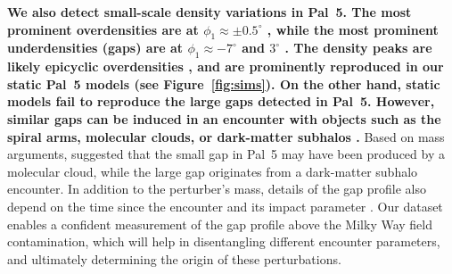 \documentclass[twocolumn]{aastex62}
\newcommand{\changes}[1]{{\textbf{#1}}}
\begin{document}
\changes{We also detect small-scale density variations in Pal~5.
The most prominent overdensities are at $\phi_1\approx\pm0.5^\circ$ \citep[consistent with][]{Kupper:2015}, while the most prominent underdensities (gaps) are at $\phi_1\approx-7^\circ$ and $3^\circ$ \citep[consistent with][]{Erkal:2017}.
The density peaks are likely epicyclic overdensities \citep[predicted by][]{Kupper:2008, Just:2009, Kupper:2010}, and are prominently reproduced in our static Pal~5 models (see Figure~\ref{fig:sims}).
On the other hand, static models fail to reproduce the large gaps detected in Pal~5.
However, similar gaps can be induced in an encounter with objects such as the spiral arms, molecular clouds, or dark-matter subhalos \citep[e.g.,][]{Johnston:2002,Ibata:2002,Yoon:2011,Amorisco:2016,Banik:2019}.
}
Based on mass arguments, \citet{Erkal:2017} suggested that the small gap in Pal~5 may have been produced by a molecular cloud, while the large gap originates from a dark-matter subhalo encounter.
In addition to the perturber's mass, details of the gap profile also depend on the time since the encounter and its impact parameter \citep{Erkal:2015}.
Our dataset enables a confident measurement of the gap profile above the Milky Way field contamination, which will help in disentangling different encounter parameters, and ultimately determining the origin of these perturbations.
\end{document}
